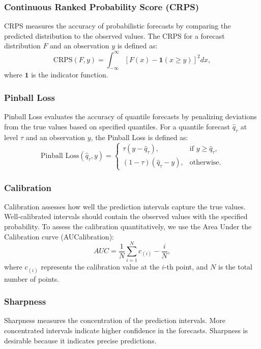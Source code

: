 \subsubsection{Continuous Ranked Probability Score (CRPS)}
CRPS measures the accuracy of probabilistic forecasts by comparing the predicted distribution to the observed values. The CRPS for a forecast distribution \( F \) and an observation \( y \) is defined as:
\begin{equation}
\text{CRPS}(F, y) = \int_{-\infty}^\infty \left[ F(x) - \mathbf{1}(x \ge y) \right]^2 dx,
\end{equation}
where \( \mathbf{1} \) is the indicator function.

\subsubsection{Pinball Loss}
Pinball Loss evaluates the accuracy of quantile forecasts by penalizing deviations from the true values based on specified quantiles. For a quantile forecast \( \hat{q}_\tau \) at level \( \tau \) and an observation \( y \), the Pinball Loss is defined as:
\begin{equation}
\text{Pinball Loss}(\hat{q}_\tau, y) = \begin{cases}
\tau (y - \hat{q}_\tau), & \text{if } y \ge \hat{q}_\tau, \\
(1 - \tau) (\hat{q}_\tau - y), & \text{otherwise}.
\end{cases}
\end{equation}

\subsubsection{Calibration}
Calibration assesses how well the prediction intervals capture the true values. Well-calibrated intervals should contain the observed values with the specified probability. To assess the calibration quantitatively, we use the Area Under the Calibration curve (AUCalibration):
\begin{equation}
AUC = \frac{1}{N} \sum_{i=1}^N c_{(i)} - \frac{i}{N},
\end{equation}
where \(c_{(i)}\) represents the calibration value at the \(i\)-th point, and \(N\) is the total number of points.

\subsubsection{Sharpness}
Sharpness measures the concentration of the prediction intervals. More concentrated intervals indicate higher confidence in the forecasts. Sharpness is desirable because it indicates precise predictions.

